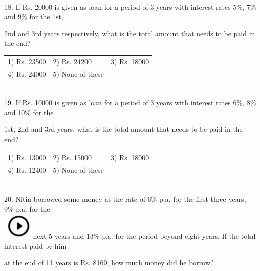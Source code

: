 \documentclass{article}
\begin{document}
	\noindent \\  18. If Rs. 20000 is given as loan for a period of 3 years with interest rates 5\%, 7\% and 9\% for the 1st,
	
	\noindent 
	
	\noindent 2nd and 3rd years respectively, what is the total amount that needs to be paid in the end?
	
	\noindent 
	
	\noindent \begin{tabular}{p{1.7in} p{1.6in} p{1.6in}} \\ 
 1) Rs. 23500               &  2) Rs. 24200        &  3) Rs. 18000        \\
4) Rs. 24000        & 5) None of these  \\
\end{tabular}
	
	\noindent 
	
	\noindent 
	
	\noindent 
	
	\noindent  \\ 19. If Rs. 10000 is given as loan for a period of 3 years with interest rates 6\%, 8\% and 10\% for the
	
	\noindent 
	
	\noindent 1st, 2nd and 3rd years, what is the total amount that needs to be paid in the end?
	
	\noindent 
	
	\noindent \begin{tabular}{p{1.7in} p{1.6in} p{1.6in}} \\ 
 1) Rs. 13000               &  2) Rs. 15000        &  3) Rs. 18000        \\
4) Rs. 12400        & 5) None of these  \\
\end{tabular}
	
	\noindent  \\ 
	
	20. Nitin borrowed some money at the rate of 6\% p.a. for the first three years, 9\% p.a. for the  
\noindent \\ \includegraphics*[width=0.60in, height=0.52in]{images/image1}next 5 years and 13\% p.a. for the period beyond eight years. If the total interest paid by him
	
	\noindent at the end of 11 years is Rs. 8160, how much money did he borrow?
	
\end{document}
